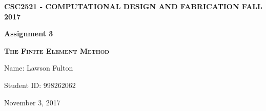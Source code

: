 \documentclass {article}
\begin{document}
	
	
	
	
	
	
	
	
	
	
	
	
	\begin{center}
		\Large
		
		\textbf{\MakeUppercase{CSC2521 - Computational Design and Fabrication Fall 2017}}
		\vfill  
		
		{
			\Huge
			\textbf{Assignment 3}
		}
		
		{
			\Large
			\textsc{\textbf{The Finite Element Method}}
		}
		
		\vfill
		Name: Lawson Fulton
		
		Student ID: 998262062
		
		November 3, 2017
	\end{center}
	
\end{document}
